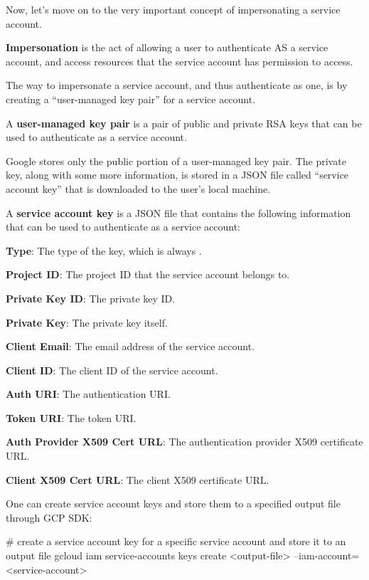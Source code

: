 Now, let's move on to the very important concept of impersonating a service account.

\bd[Impersonation]
\textbf{Impersonation} is the act of allowing a user to authenticate AS a service account, and access resources that the
service account has permission to access.
\ed

The way to impersonate a service account, and thus authenticate as one, is by creating a ``user-managed key pair'' for
a service account.

A \textbf{user-managed key pair} is a pair of public and private RSA keys that can be used to authenticate as a service
account.
\ed

Google stores only the public portion of a user-managed key pair. The private key, along with some more information,
is stored in a JSON file called ``service account key'' that is downloaded to the user's local machine.

A \textbf{service account key} is a JSON file that contains the following information that can be used to authenticate
as a service account:
\bit
\item \textbf{Type}: The type of the key, which is always .
\item \textbf{Project ID}: The project ID that the service account belongs to.
\item \textbf{Private Key ID}: The private key ID\@.
\item \textbf{Private Key}: The private key itself.
\item \textbf{Client Email}: The email address of the service account.
\item \textbf{Client ID}: The client ID of the service account.
\item \textbf{Auth URI}: The authentication URI\@.
\item \textbf{Token URI}: The token URI\@.
\item \textbf{Auth Provider X509 Cert URL}: The authentication provider X509 certificate URL\@.
\item \textbf{Client X509 Cert URL}: The client X509 certificate URL\@.
\eit
\ed

One can create service account keys and store them to a specified output file through GCP SDK:
\begin{bash}
# create a service account key for a specific service account and store it to an output file
gcloud iam service-accounts keys create <output-file> --iam-account=<service-account>
\end{bash}


